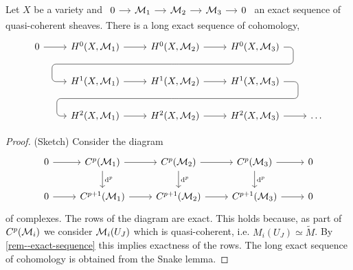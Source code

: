 \documentclass[a4paper,11pt]{article}
\begin{document}
			\begin{prop}
				Let $X$ be a variety and $\begin{tikzcd}[column sep=small]
					0\ar[r] & \M_1\ar[r] & \M_2\ar[r] & \M_3\ar[r] & 0
				\end{tikzcd}$ an exact sequence of quasi-coherent sheaves. There is a long exact sequence of cohomology,
				\begin{equation*}
					\begin{tikzcd}
						0\ar[r] & H^0(X,\M_1)\ar[r] & H^0(X,\M_2) \ar[r]\ar[d, phantom, ""{coordinate, name=Z}] & H^0(X,\M_3) \ar[dll,
						rounded corners,
						to path={ -- ([xshift=1em]\tikztostart.east) 
						|- (Z) [near end]\tikztonodes 
						-| ([xshift=-1.5em]\tikztotarget.west) 
						-- (\tikztotarget)}]\\
						& H^1(X,\M_1)\ar[r] & H^1(X,\M_2) \ar[r]\ar[d, phantom, ""{coordinate, name=Z}] & H^1(X,\M_3) \ar[dll,
						rounded corners,
						to path={ -- ([xshift=1.5em]\tikztostart.east) 
						|- (Z) [near end]\tikztonodes 
						-| ([xshift=-1em]\tikztotarget.west) 
						-- (\tikztotarget)}]\\
						& H^2(X,\M_1) \ar[r] & H^2(X,\M_2)\ar[r] & H^2(X,\M_3)\ar[r] & \dots
					\end{tikzcd}
				\end{equation*}
			\end{prop}
			\begin{proof}\renewcommand{\qedsymbol}{}
				(Sketch) Consider the diagram
				\begin{equation*}
					\begin{tikzcd}
						0\ar[r] & C^p(\M_1)\ar[r]\ar[d,"\mathrm{d}^p"] & C^p(\M_2)\ar[r]\ar[d,"\mathrm{d}^p"] & C^p(\M_3)\ar[r]\ar[d,"\mathrm{d}^p"] & 0\\
						0\ar[r] & C^{p+1}(\M_1)\ar[r] & C^{p+1}(\M_2)\ar[r] & C^{p+1}(\M_3)\ar[r] & 0
					\end{tikzcd}
				\end{equation*}
				of complexes. The rows of the diagram are exact. This holds because, as part of $C^p(\mathcal{M}_i)$ we consider $\mathcal{M}_i(U_J)$ which is quasi-coherent, i.e. $M_i(U_J)\simeq\widetilde{M}$. By \autoref{rem--exact-sequence} this implies exactness of the rows. The long exact sequence of cohomology is obtained from the Snake lemma.
			\end{proof}\renewcommand{\qedsymbol}{$\square$}
\end{document}
